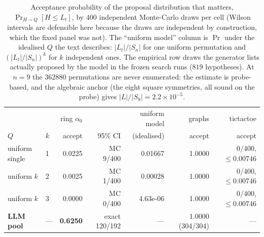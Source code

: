 \documentclass[11pt]{article}
\begin{document}
\begin{table}[t]
\centering
\caption{Acceptance probability of the proposal distribution that matters,
$\Pr_{H\sim Q}[H \le L_t]$, by $400$ independent Monte-Carlo draws per cell (Wilson
intervals are defensible here because the draws are independent by construction, which the
fixed panel was not). The ``uniform model'' column is $\Pr$ under the idealised
$Q$ the text describes: $|L_t|/|S_n|$ for one uniform permutation and $(|L_t|/|S_n|)^k$ for
$k$ independent ones. The empirical row draws the generator lists actually proposed by the
model in the frozen search runs ($819$ hypotheses). At $n=9$ the $362880$ permutations are
never enumerated: the estimate is probe-based, and the algebraic anchor (the eight square
symmetries, all sound on the probe) gives $|L|/|S_9| = 2.2\times10^{-5}$.}
\label{tab:accept}
\small
\begin{tabular}{@{}llrrrrr@{}}
\toprule
& & ring $\alpha_0$ & & uniform model & graphs & tictactoe \\
$Q$ & $k$ & accept & 95\% CI & (idealised) & accept & accept \\
\midrule
uniform single & 1 & 0.0225 & MC 9/400 & 0.01667 & 1.0000 & $0/400$, $\le 0.00746$ \\
uniform $k$ & 2 & 0.0025 & MC 1/400 & 0.00028 & 1.0000 & $0/400$, $\le 0.00746$ \\
uniform $k$ & 3 & 0.0000 & MC 0/400 & 4.63e-06 & 1.0000 & $0/400$, $\le 0.00746$ \\
\textbf{LLM pool} & --- & \textbf{0.6250} & exact 120/192 & --- & 1.0000 (304/304) & --- \\
\bottomrule
\end{tabular}
\end{table}
\end{document}
